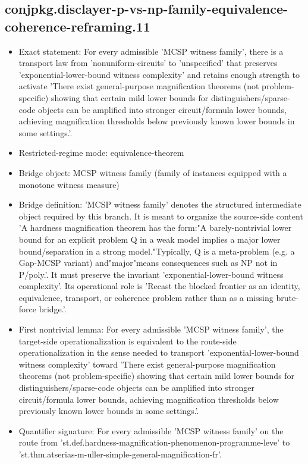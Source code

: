 \documentclass[11pt]{article}
\begin{document}
\subsection*{conjpkg.disclayer-p-vs-np-family-equivalence-coherence-reframing.11}
\begin{itemize}
\item Exact statement: For every admissible 'MCSP witness family', there is a transport law from 'nonuniform-circuits' to 'unspecified' that preserves 'exponential-lower-bound witness complexity' and retains enough strength to activate 'There exist general-purpose magnification theorems (not problem-specific) showing that certain mild lower bounds for distinguishers/sparse-code objects can be amplified into stronger circuit/formula lower bounds, achieving magnification thresholds below previously known lower bounds in some settings.'.
\item Restricted-regime mode: equivalence-theorem
\item Bridge object: MCSP witness family (family of instances equipped with a monotone witness measure)
\item Bridge definition: 'MCSP witness family' denotes the structured intermediate object required by this branch. It is meant to organize the source-side content 'A hardness magnification theorem has the form:"A barely-nontrivial lower bound for an explicit problem Q in a weak model implies a major lower bound/separation in a strong model."Typically, Q is a meta-problem (e.g. a Gap-MCSP variant) and"major"means consequences such as NP not in P/poly.'. It must preserve the invariant 'exponential-lower-bound witness complexity'. Its operational role is 'Recast the blocked frontier as an identity, equivalence, transport, or coherence problem rather than as a missing brute-force bridge.'.
\item First nontrivial lemma: For every admissible 'MCSP witness family', the target-side operationalization is equivalent to the route-side operationalization in the sense needed to transport 'exponential-lower-bound witness complexity' toward 'There exist general-purpose magnification theorems (not problem-specific) showing that certain mild lower bounds for distinguishers/sparse-code objects can be amplified into stronger circuit/formula lower bounds, achieving magnification thresholds below previously known lower bounds in some settings.'.
\item Quantifier signature: For every admissible 'MCSP witness family' on the route from 'st.def.hardness-magnification-phenomenon-programme-leve' to 'st.thm.atserias-m-uller-simple-general-magnification-fr'.

\end{itemize}
\end{document}
